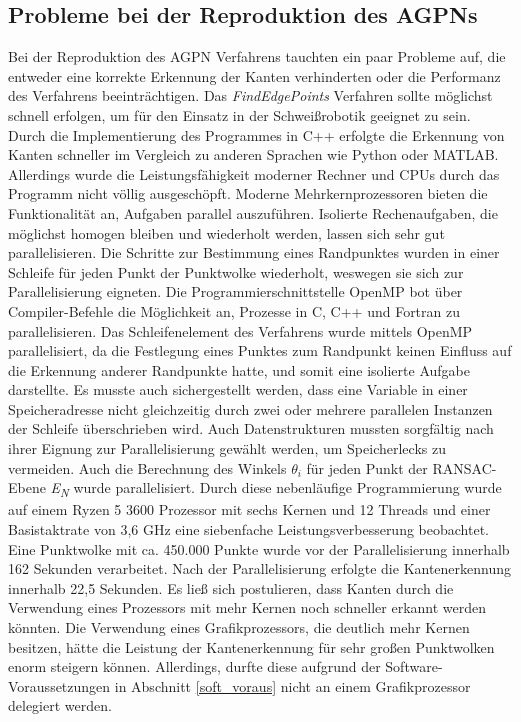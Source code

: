 \subsection{Probleme bei der Reproduktion des AGPNs}
Bei der Reproduktion des AGPN Verfahrens tauchten ein paar Probleme auf, die entweder eine korrekte Erkennung der Kanten verhinderten oder die Performanz des Verfahrens beeinträchtigen. Das \textit{FindEdgePoints} Verfahren sollte möglichst schnell erfolgen, um für den Einsatz in der Schweißrobotik geeignet zu sein. Durch die Implementierung des Programmes in C++ erfolgte die Erkennung von Kanten schneller im Vergleich zu anderen Sprachen wie Python oder MATLAB. Allerdings wurde die Leistungsfähigkeit moderner Rechner und CPUs durch das Programm nicht völlig ausgeschöpft. Moderne Mehrkernprozessoren bieten die Funktionalität an, Aufgaben parallel auszuführen. Isolierte Rechenaufgaben, die möglichst homogen bleiben und wiederholt werden, lassen sich sehr gut parallelisieren. Die Schritte zur Bestimmung eines Randpunktes wurden in einer Schleife für jeden Punkt der Punktwolke wiederholt, weswegen sie sich zur Parallelisierung eigneten. Die Programmierschnittstelle OpenMP bot über Compiler-Befehle die Möglichkeit an, Prozesse in C, C++ und Fortran zu parallelisieren. Das Schleifenelement des Verfahrens wurde mittels OpenMP parallelisiert, da die Festlegung eines Punktes zum Randpunkt keinen Einfluss auf die Erkennung anderer Randpunkte hatte, und somit eine isolierte Aufgabe darstellte. Es musste auch sichergestellt werden, dass eine Variable in einer Speicheradresse nicht gleichzeitig durch zwei oder mehrere parallelen Instanzen der Schleife überschrieben wird. Auch Datenstrukturen mussten sorgfältig nach ihrer Eignung zur Parallelisierung gewählt werden, um Speicherlecks zu vermeiden. Auch die Berechnung des Winkels $\theta_i$ für jeden Punkt der RANSAC-Ebene \textit{E\textsubscript{N}} wurde parallelisiert. Durch diese nebenläufige Programmierung wurde auf einem Ryzen 5 3600 Prozessor \autocite{noauthor_amd_2022} mit sechs Kernen und 12 Threads und einer Basistaktrate von 3,6 GHz eine siebenfache Leistungsverbesserung beobachtet. Eine Punktwolke mit ca. 450.000 Punkte wurde vor der Parallelisierung innerhalb 162 Sekunden verarbeitet. Nach der Parallelisierung erfolgte die Kantenerkennung innerhalb 22,5 Sekunden. Es ließ sich postulieren, dass Kanten durch die Verwendung eines Prozessors mit mehr Kernen noch schneller erkannt werden könnten. Die Verwendung eines Grafikprozessors, die deutlich mehr Kernen besitzen, hätte die Leistung der Kantenerkennung für sehr großen Punktwolken enorm steigern können. Allerdings, durfte diese aufgrund der Software-Voraussetzungen in Abschnitt \ref{soft_voraus} nicht an einem Grafikprozessor delegiert werden.

